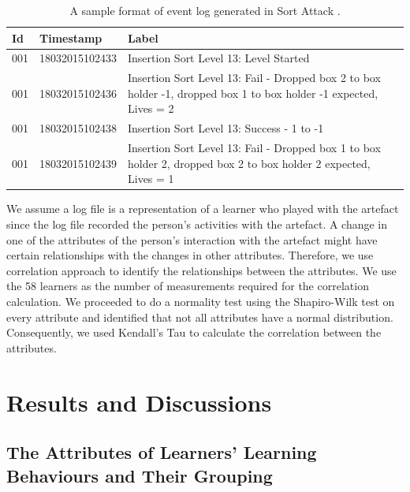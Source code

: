 \documentclass[conference]{IEEEtran}
\begin{document}
\begin{table}[]
  \centering
  \caption{A sample format of event log generated in Sort Attack \cite{yohannis2015visualization}.}
  \label{tab:log}
  \begin{tabular}{p{.02\linewidth} p{.2\linewidth} p{.62\linewidth}}
    \hline
    \textbf{Id} & \textbf{Timestamp} & \textbf{Label}                                                                                                         \\ \hline
    001         & 18032015102433     & Insertion Sort Level 13: Level Started                                                                                 \\
    001         & 18032015102436     & Insertion   Sort Level 13: Fail - Dropped box 2 to box holder -1, dropped box 1 to box   holder -1 expected, Lives = 2 \\
    001         & 18032015102438     & Insertion   Sort Level 13: Success - 1 to -1                                                                           \\
    001         & 18032015102439     & Insertion Sort Level 13: Fail - Dropped box 1 to box holder 2, dropped box 2 to box holder 2 expected, Lives = 1       \\ \hline
  \end{tabular}
\end{table}

We assume a log file is a representation of a learner who played with the artefact since the log file recorded the person’s activities with the artefact. A change in one of the attributes of the person’s interaction with the artefact might have certain relationships with the changes in other attributes. Therefore, we use correlation approach to identify the relationships between the attributes.  We use the 58 learners as the number of measurements required for the correlation calculation. We proceeded to do a normality test using the Shapiro-Wilk test \cite{shapiro1965variance} on every attribute and identified that not all attributes have a normal distribution. Consequently, we used Kendall’s Tau \cite{kendall1938correlation} to calculate the correlation between the attributes.


\section{Results and Discussions}
\label{sec:results_and_discussions}

\subsection{The Attributes of Learners’ Learning Behaviours and Their Grouping}
\label{sec:attributes}
\end{document}
